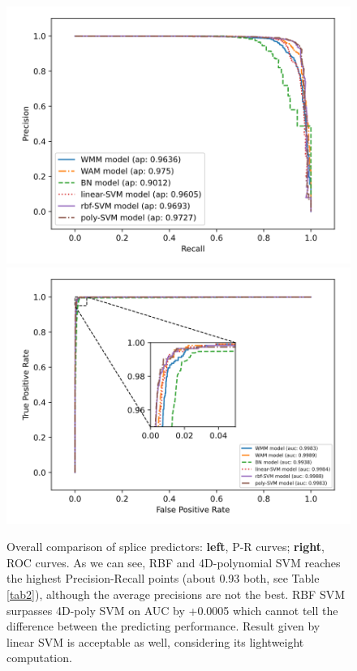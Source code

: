 \documentclass[journal,twoside]{IEEEtran}
\begin{document}
\begin{figure}[htbp]
\centerline{\includegraphics[scale=0.28]{Pics/all_prcurve_donor.png}
    \includegraphics[scale=0.28]{Pics/all_roccurve_donor.png}}
\caption{Overall comparison of splice predictors: \textbf{left}, P-R curves; \textbf{right}, ROC curves. As we can see, RBF and 4D-polynomial SVM reaches the highest Precision-Recall points (about 0.93 both, see Table \ref{tab2}), although the average precisions are not the best. RBF SVM surpasses 4D-poly SVM on AUC by +0.0005 which cannot tell the difference between the predicting performance. Result given by linear SVM is acceptable as well, considering its lightweight computation. }
\label{fig5}
\end{figure}
\end{document}
